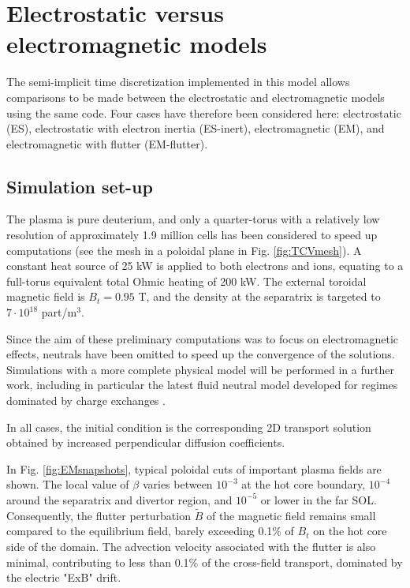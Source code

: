 \section{Electrostatic versus electromagnetic models}

The semi-implicit time discretization implemented in this model allows comparisons to be made between the electrostatic and electromagnetic models using the same code. Four cases have therefore been considered here: electrostatic (ES), electrostatic with electron inertia (ES-inert), electromagnetic (EM), and electromagnetic with flutter (EM-flutter).

\subsection{Simulation set-up}

The plasma is pure deuterium, and only a quarter-torus with a relatively low resolution of approximately 1.9 million cells has been considered to speed up computations (see the mesh in a poloidal plane in Fig. \ref{fig:TCVmesh}). A constant heat source of 25 kW is applied to both electrons and ions, equating to a full-torus equivalent total Ohmic heating of 200 kW. The external toroidal magnetic field is $B_t = 0.95$ T, and the density at the separatrix is targeted to $7 \cdot 10^{18}$ part/m$^3$. \newline

Since the aim of these preliminary computations was to focus on electromagnetic effects, neutrals have been omitted to speed up the convergence of the solutions. Simulations with a more complete physical model will be performed in a further work, including in particular the latest fluid neutral model \cite{quadri2024} developed for regimes dominated by charge exchanges \cite{horsten2017}. \newline

In all cases, the initial condition is the corresponding 2D transport solution obtained by increased perpendicular diffusion coefficients. \newline

In Fig. \ref{fig:EMsnapshots}, typical poloidal cuts of important plasma fields are shown. The local value of $\beta$ varies between $10^{-3}$ at the hot core boundary, $10^{-4}$ around the separatrix and divertor region, and $10^{-5}$ or lower in the far SOL. Consequently, the flutter perturbation $\tilde{B}$ of the magnetic field remains small compared to the equilibrium field, barely exceeding 0.1\% of $B_t$ on the hot core side of the domain. The advection velocity associated with the flutter is also minimal, contributing to less than 0.1\% of the cross-field transport, dominated by the electric "ExB" drift. \newline

